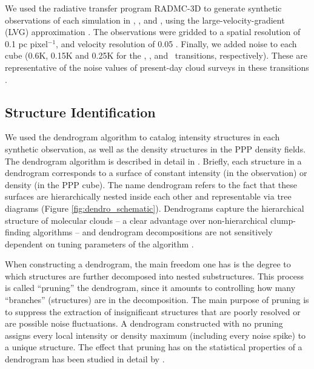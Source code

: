 
We used the radiative transfer program RADMC-3D
\citep{http://adsabs.harvard.edu/abs/2012ascl.soft02015D} to generate
synthetic observations of each simulation in \coa, \cob, and \coc, using the large-velocity-gradient (LVG) approximation \citep{http://adsabs.harvard.edu/abs/1957SvA.....1..678S, http://adsabs.harvard.edu/abs/2011MNRAS.412.1686S}. The observations were
gridded to a spatial resolution of 0.1 pc pixel$^{-1}$, and velocity
resolution of 0.05 \kms. Finally, we added noise to each cube (0.6K,
0.15K and 0.25K for the \coa, \cob, and \coc\, transitions, respectively). These are
representative of the noise values of present-day cloud surveys in these
transitions
\citep{http://adsabs.harvard.edu/abs/2006AJ....131.2921R, http://adsabs.harvard.edu/abs/2010MNRAS.405..759D}.

\subsection{ Structure Identification}
\label{sec:structure_identification}

We used the dendrogram algorithm to
catalog intensity structures in each synthetic observation, as well as the density
structures in the PPP density fields. The dendrogram algorithm is
described in detail in
\cite{http://adsabs.harvard.edu/abs/2008ApJ...679.1338R}. Briefly, each
structure in a dendrogram corresponds to a surface of constant intensity
(in the observation) or density (in the PPP cube). The name dendrogram
refers to the fact that these surfaces are hierarchically nested inside
each other and representable via tree diagrams (Figure \ref{fig:dendro_schematic}). Dendrograms
capture the hierarchical structure of molecular clouds -- a clear advantage over non-hierarchical
clump-finding algorithms -- and dendrogram decompositions are
not sensitively dependent on tuning parameters of the algorithm
\citep{http://adsabs.harvard.edu/abs/2009ApJ...699L.134P}.

When constructing a dendrogram, the main freedom one has is the degree to
which structures are further decomposed into nested substructures. This
process is called ``pruning'' the dendrogram, since it amounts to
controlling how many ``branches'' (structures) are in the decomposition.
The main purpose of pruning is to suppress the extraction of
insignificant structures that are poorly resolved or are possible noise
fluctuations. A dendrogram constructed with no pruning assigns
every local intensity or density maximum (including every noise spike)
to a unique structure. The effect that pruning has on the statistical properties of a dendrogram
has been studied in detail by \cite{http://adsabs.harvard.edu/abs/2013ApJ...770..141B}.

